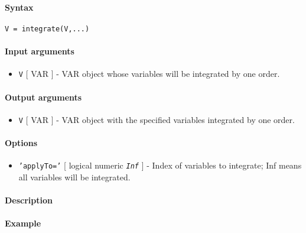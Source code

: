 


	\paragraph{Syntax}

\begin{verbatim}
V = integrate(V,...)
\end{verbatim}

\paragraph{Input arguments}

\begin{itemize}
\itemsep1pt\parskip0pt
\item
  \texttt{V} {[} VAR {]} - VAR object whose variables will be integrated
  by one order.
\end{itemize}

\paragraph{Output arguments}

\begin{itemize}
\itemsep1pt\parskip0pt
\item
  \texttt{V} {[} VAR {]} - VAR object with the specified variables
  integrated by one order.
\end{itemize}

\paragraph{Options}

\begin{itemize}
\itemsep1pt\parskip0pt
\item
  \texttt{'applyTo='} {[} logical \textbar{} numeric \textbar{}
  \emph{\texttt{Inf}} {]} - Index of variables to integrate; Inf means
  all variables will be integrated.
\end{itemize}

\paragraph{Description}

\paragraph{Example}


